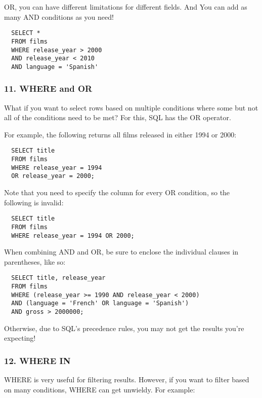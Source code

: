 \documentclass[
]{article}
\begin{document}
OR, you can have different limitations for different fields. And You can
add as many AND conditions as you need!

\begin{verbatim}
  SELECT *
  FROM films
  WHERE release_year > 2000
  AND release_year < 2010
  AND language = 'Spanish'
\end{verbatim}

\hypertarget{where-and-or}{%
\subsubsection{11. WHERE and OR}\label{where-and-or}}

What if you want to select rows based on multiple conditions where some
but not all of the conditions need to be met? For this, SQL has the OR
operator.

For example, the following returns all films released in either 1994 or
2000:

\begin{verbatim}
  SELECT title
  FROM films
  WHERE release_year = 1994
  OR release_year = 2000;
\end{verbatim}

Note that you need to specify the column for every OR condition, so the
following is invalid:

\begin{verbatim}
  SELECT title
  FROM films
  WHERE release_year = 1994 OR 2000;
\end{verbatim}

When combining AND and OR, be sure to enclose the individual clauses in
parentheses, like so:

\begin{verbatim}
  SELECT title, release_year
  FROM films
  WHERE (release_year >= 1990 AND release_year < 2000)
  AND (language = 'French' OR language = 'Spanish')
  AND gross > 2000000;
\end{verbatim}

Otherwise, due to SQL's precedence rules, you may not get the results
you're expecting!

\hypertarget{where-in}{%
\subsubsection{12. WHERE IN}\label{where-in}}

WHERE is very useful for filtering results. However, if you want to
filter based on many conditions, WHERE can get unwieldy. For example:
\end{document}
